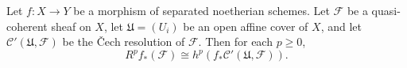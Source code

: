 Let $f: X \to Y$ be a morphism of separated noetherian schemes. Let $\mathcal{F}$ be a quasi-coherent sheaf on $X$, let $\mathfrak{U} = (U_i)$ be an open affine cover of $X$, and let $\mathcal{C}'(\mathfrak{U}, \mathcal{F})$ be the Čech resolution of $\mathcal{F}$. Then for each $p \geqslant 0$,
$$R^p f_*(\mathcal{F}) \cong h^p(f_*\mathcal{C}'(\mathfrak{U}, \mathcal{F})).$$
